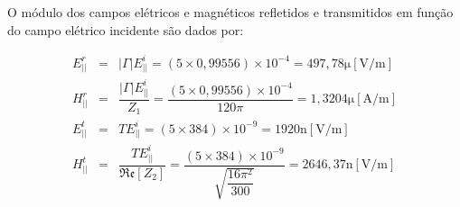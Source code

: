 \begin{enumerate}[1.]
O módulo dos campos elétricos e magnéticos refletidos e transmitidos em função do campo elétrico incidente são dados por:

\begin{eqnarray*}
E^{r}_{||} & = & |\Gamma| E^{i}_{||} = (5 \times 0,99556) \times 10^{-4} = 497,78\si{\micro}[\si{\volt/\meter}] \nonumber \\
H^{r}_{||} & = & \dfrac{|\Gamma| E^{i}_{||}}{Z_{1}} = \dfrac{(5 \times 0,99556) \times 10^{-4}}{120\pi} = 1,3204\si{\micro}[\si{\ampere/\meter}]\nonumber \\
E^{t}_{||} & = & T E^{i}_{||} = (5 \times 384) \times 10^{-9} = 1920\si{\nano}[\si{\volt/\meter}]\nonumber \\
H^{t}_{||} & = & \dfrac{T E^{i}_{||}}{\mathfrak{Re}[Z_{2}]} = \dfrac{(5 \times 384) \times 10^{-9}}{\sqrt{\dfrac{16\pi^{2}}{300}}} = 2646,37\si{\nano}[\si{\volt/\meter}]\nonumber
\end{eqnarray*}

\end{enumerate}
 


